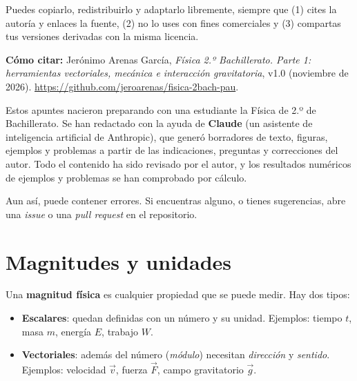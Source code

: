 \documentclass[11pt,a4paper]{article}
\newcommand{\autor}{Jerónimo Arenas García}
\newcommand{\repo}{https://github.com/jeroarenas/fisica-2bach-pau}
\newcommand{\version}{v1.0 (noviembre de 2026)}
\begin{document}
\begin{titlepage}
\begin{tcolorbox}[colback=gray!4,colframe=gray!60!black,fonttitle=\bfseries,title={Licencia},halign=left,width=\textwidth]
Puedes copiarlo, redistribuirlo y adaptarlo libremente, siempre que (1) cites la autoría y enlaces la fuente, (2) no lo uses con fines comerciales y (3) compartas tus versiones derivadas con la misma licencia.

\textbf{Cómo citar:} \autor, \emph{Física 2.º Bachillerato. Parte 1: herramientas vectoriales, mecánica e interacción gravitatoria}, \version. \url{\repo}.
\end{tcolorbox}

\begin{tcolorbox}[colback=gray!4,colframe=gray!60!black,fonttitle=\bfseries,title={Cómo se ha elaborado este documento},halign=left,width=\textwidth]
\small
Estos apuntes nacieron preparando con una estudiante la Física de 2.º de Bachillerato. Se han redactado con la ayuda de \textbf{Claude} (un asistente de inteligencia artificial de Anthropic), que generó borradores de texto, figuras, ejemplos y problemas a partir de las indicaciones, preguntas y correcciones del autor. Todo el contenido ha sido revisado por el autor, y los resultados numéricos de ejemplos y problemas se han comprobado por cálculo.

Aun así, puede contener errores. Si encuentras alguno, o tienes sugerencias, abre una \emph{issue} o una \emph{pull request} en el repositorio.
\end{tcolorbox}




\end{titlepage}

\tableofcontents

\section{Magnitudes y unidades}
Una \textbf{magnitud física} es cualquier propiedad que se puede medir. Hay dos tipos:
\begin{itemize}[itemsep=2pt]
  \item \textbf{Escalares}: quedan definidas con un número y su unidad. Ejemplos: tiempo $t$, masa $m$, energía $E$, trabajo $W$.
  \item \textbf{Vectoriales}: además del número (\emph{módulo}) necesitan \emph{dirección} y \emph{sentido}. Ejemplos: velocidad $\vec v$, fuerza $\vec F$, campo gravitatorio $\vec g$.
\end{itemize}
\end{document}
